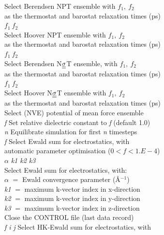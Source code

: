 \begin{tabbing}
\> \>Select Berendsen NPT ensemble with $f_{1},~f_{2}$ \\
\> \>as the thermostat and  barostat relaxation times (ps) \\
 $f_{1}~f_{2}$ \\
\> \>Select Hoover NPT ensemble with  $f_{1},~f_{2}$ \\
\> \> as the thermostat and barostat relaxation times (ps) \\
 $f_{1}~f_{2}$ \\
\> \>Select Berendsen N$\mbox{$\underline{\underline{\bf \sigma}}$}$T
ensemble, with $f_{1},~f_{2}$
\\
\> \> as the thermostat and  barostat relaxation times (ps) \\
 $f_{1}~f_{2}$ \\
\> \>Select Hoover N$\mbox{$\underline{\underline{\bf \sigma}}$}$T ensemble with $f_{1},~f_{2}$ \\
\> \> as the thermostat and barostat relaxation times (ps) \\
\> Select (NVE) potential of mean force ensemble \\
 {\em f}\> Set relative dielectric constant to {\em f}
(default 1.0)\\
 {\em n} \> Equilibrate simulation for first {\em n}
timesteps\\
 {\em f} \> Select Ewald sum for electrostatics, with  \\
\> \>automatic parameter optimisation ($0<f<1.E-4$) \\
  $\alpha$ {\em k1 k2 k3} \\
\> \> Select Ewald sum for electrostatics, with:\\
\> \> $\alpha$ $=$ Ewald convergence parameter (\AA$^{-1}$)\\
\> \> {\em k1} $=$ maximum k-vector index in x-direction\\
\> \> {\em k2} $=$ maximum k-vector index in y-direction\\
\> \> {\em k3} $=$ maximum k-vector index in z-direction\\
 \> Close the CONTROL file (last data record)\\
 {\em f i j} \>Select HK-Ewald
sum for electrostatics, with  \\

\end{tabbing}
